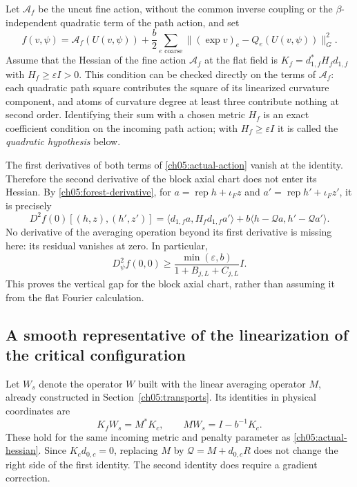 Let $\mathcal A_f$ be the uncut fine action, without the common inverse
coupling or the $\beta$-independent quadratic term of the path action, and set
\begin{equation}
 f(v,\psi)=\mathcal A_f(U(v,\psi))
       +\frac b2\sum_{e\text{ coarse}}\bigl\|(\exp v)_e
                                   -Q_e(U(v,\psi))\bigr\|_G^2.
 \label{ch05:actual-action}
\end{equation}
Assume that the Hessian of the fine action $\mathcal A_f$ at the flat
field is $K_f=d_{1,f}^*H_fd_{1,f}$ with $H_f\ge\varepsilon I>0$.
This condition can be checked directly on the terms of $\mathcal A_f$: each quadratic path
square contributes the square of its linearized curvature component, and atoms
of curvature degree at least three contribute nothing at second order.
Identifying their sum with a chosen metric $H_f$ is an exact coefficient
condition on the incoming path action; with $H_f\ge\varepsilon I$ it is called the \emph{quadratic hypothesis} below.

The first derivatives of both terms of \eqref{ch05:actual-action} vanish
at the identity. Therefore the second derivative of the block axial chart does
not enter its Hessian. By \eqref{ch05:forest-derivative}, for
$a=\operatorname{rep}h+\iota_Fz$ and
$a'=\operatorname{rep}h'+\iota_Fz'$, it is precisely
\begin{equation}
 D^2 f(0)[(h,z),(h',z')]
   =\langle d_{1,f}a,H_fd_{1,f}a'\rangle
           +b\langle h-\mathcal Qa,h'-\mathcal Qa'\rangle.
 \label{ch05:actual-hessian}
\end{equation}
No derivative of the averaging operation beyond its first
derivative is missing here: its residual vanishes at zero. In particular,
\begin{equation}
 D_\psi^2f(0,0)\ge
       \frac{\min(\varepsilon,b)}{1+B_{j,L}+C_{j,L}}I.
 \label{ch05:actual-gap}
\end{equation}
This proves the vertical gap for the block axial chart, rather than
assuming it from the flat Fourier calculation.

\subsection{A smooth representative of the linearization of the critical configuration}
\label{ch05:actual-tangent}

Let $W_s$ denote the operator $W$ built with the linear averaging operator $M$, already constructed in
Section~\ref{ch05:transports}. Its identities in physical coordinates are
\[
 K_fW_s=M^*K_c,\qquad MW_s=I-b^{-1}K_c.
\]
These hold for the same incoming metric and penalty parameter as
\eqref{ch05:actual-hessian}. Since $K_cd_{0,c}=0$, replacing $M$ by
$\mathcal Q=M+d_{0,c}R$ does not change the right side of the first
identity. The second identity does require a gradient correction.

